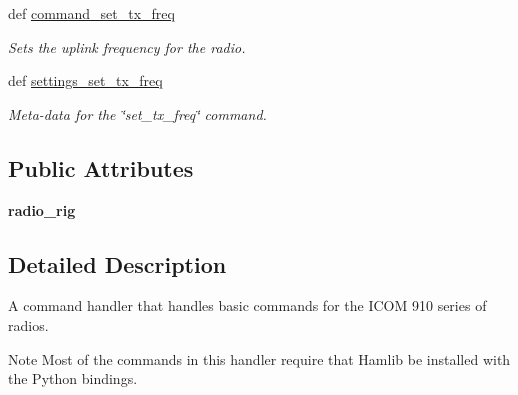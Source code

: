 \begin{DoxyCompactItemize}
def \hyperlink{classhwm_1_1hardware_1_1devices_1_1drivers_1_1icom__910_1_1icom__910_1_1_i_c_o_m910_handler_ae44eddcf317a50ef1bf8f11353f3a4f1}{command\-\_\-set\-\_\-tx\-\_\-freq}
\begin{DoxyCompactList}\small\item\em Sets the uplink frequency for the radio. \end{DoxyCompactList}\item 
def \hyperlink{classhwm_1_1hardware_1_1devices_1_1drivers_1_1icom__910_1_1icom__910_1_1_i_c_o_m910_handler_afa1ed05cf46c841c3c494a8b5869790a}{settings\-\_\-set\-\_\-tx\-\_\-freq}
\begin{DoxyCompactList}\small\item\em Meta-\/data for the \char`\"{}set\-\_\-tx\-\_\-freq\char`\"{} command. \end{DoxyCompactList}\end{DoxyCompactItemize}
\subsection*{Public Attributes}
\begin{DoxyCompactItemize}
\item 
\hypertarget{classhwm_1_1hardware_1_1devices_1_1drivers_1_1icom__910_1_1icom__910_1_1_i_c_o_m910_handler_a0f4d5b69ebf8d384e86bb0ebba686233}{{\bfseries radio\-\_\-rig}}\label{classhwm_1_1hardware_1_1devices_1_1drivers_1_1icom__910_1_1icom__910_1_1_i_c_o_m910_handler_a0f4d5b69ebf8d384e86bb0ebba686233}

\end{DoxyCompactItemize}


\subsection{Detailed Description}
A command handler that handles basic commands for the I\-C\-O\-M 910 series of radios. 

\begin{DoxyNote}{Note}
Most of the commands in this handler require that Hamlib be installed with the Python bindings. 
\end{DoxyNote}



